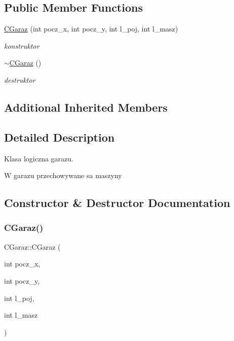 \subsection*{Public Member Functions}
\begin{DoxyCompactItemize}
\item 
\mbox{\hyperlink{class_c_garaz_a1695f754fdfcd31e7a832bdce6063b32}{C\+Garaz}} (int pocz\+\_\+x, int pocz\+\_\+y, int l\+\_\+poj, int l\+\_\+masz)
\begin{DoxyCompactList}\small\item\em konstruktor \end{DoxyCompactList}\item 
\mbox{\label{class_c_garaz_aca61712c85918277c6f2896a13cac2c0}} 
\mbox{\hyperlink{class_c_garaz_aca61712c85918277c6f2896a13cac2c0}{$\sim$\+C\+Garaz}} ()
\begin{DoxyCompactList}\small\item\em destruktor \end{DoxyCompactList}\end{DoxyCompactItemize}
\subsection*{Additional Inherited Members}


\subsection{Detailed Description}
Klasa logiczna garazu. 

W garazu przechowywane sa maszyny 

\subsection{Constructor \& Destructor Documentation}
\mbox{\label{class_c_garaz_a1695f754fdfcd31e7a832bdce6063b32}} 
\subsubsection{\texorpdfstring{C\+Garaz()}{CGaraz()}}
{\footnotesize\ttfamily C\+Garaz\+::\+C\+Garaz (\begin{DoxyParamCaption}\item[{int}]{pocz\+\_\+x,  }\item[{int}]{pocz\+\_\+y,  }\item[{int}]{l\+\_\+poj,  }\item[{int}]{l\+\_\+masz }\end{DoxyParamCaption})}



